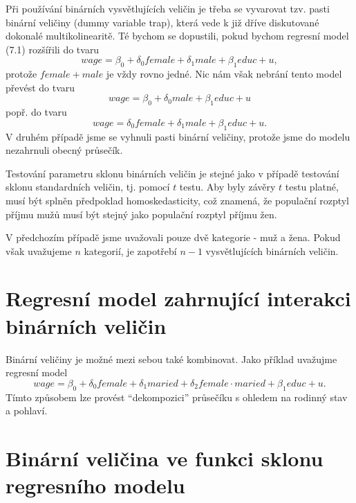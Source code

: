 Při používání binárních vysvětlujících veličin je třeba se 
vyvarovat tzv. pasti binární veličiny (dummy variable trap), která vede k již dříve 
diskutované dokonalé multikolinearitě. Té bychom se dopustili, 
pokud bychom regresní model (7.1) rozšířili do tvaru
\begin{equation}
wage = \beta_0 + \delta_0 female + \delta_1 male + \beta_1 educ + u,
\end{equation}
protože $female + male$ je vždy rovno jedné. Nic nám však nebrání 
tento model převést do tvaru
\begin{equation}
wage = \beta_0 + \delta_0 male + \beta_1 educ + u
\end{equation}
popř. do tvaru
\begin{equation}
wage = \delta_0 female + \delta_1 male + \beta_1 educ + u.
\end{equation}
V druhém případě jsme se vyhnuli pasti binární veličiny, 
protože jsme do modelu nezahrnuli obecný průsečík.

Testování parametru sklonu binárních veličin je stejné jako v 
případě testování sklonu standardních veličin, tj. pomocí $t$ 
testu. Aby byly závěry $t$ testu platné, musí být splněn 
předpoklad homoskedasticity, což znamená, že populační rozptyl 
příjmu mužů musí být stejný jako populační rozptyl příjmu žen.

V předchozím případě jsme uvažovali pouze dvě kategorie - muž a 
žena. Pokud však uvažujeme $n$ kategorií, je zapotřebí $n-1$ 
vysvětlujících binárních veličin.

\section{Regresní model zahrnující interakci binárních veličin}

Binární veličiny je možné mezi sebou také kombinovat. Jako 
příklad uvažujme regresní model
\begin{equation}
wage = \beta_0 + \delta_0 female + \delta_1 maried + \delta_2 female 
\cdot maried + \beta_1 educ + u.
\end{equation}
Tímto způsobem lze provést ``dekompozici'' průsečíku s ohledem na 
rodinný stav a pohlaví.

\section{Binární veličina ve funkci sklonu regresního modelu}

